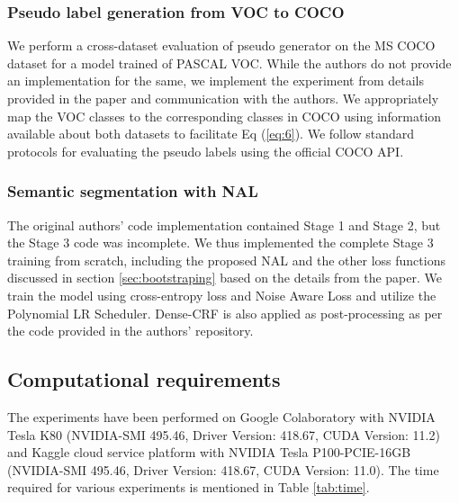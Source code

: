 \subsubsection{Pseudo label generation from VOC to COCO}

We perform a cross-dataset evaluation of pseudo generator on the MS COCO dataset for a model trained of PASCAL VOC. While the authors do not provide an implementation for the same, we implement the experiment from details provided in the paper and communication with the authors. We appropriately map the VOC classes to the corresponding classes in COCO using information available about both datasets to facilitate Eq (\ref{eq:6}). We follow standard protocols for evaluating the pseudo labels using the official COCO API.

\subsubsection{Semantic segmentation with NAL}

The original authors' code implementation contained Stage 1 and Stage 2, but the Stage 3 code was incomplete. We thus implemented the complete Stage 3 training from scratch, including the proposed NAL and the other loss functions discussed in section \ref{sec:bootstraping} based on the details from the paper. We train the model using cross-entropy loss and Noise Aware Loss and utilize the Polynomial LR Scheduler. Dense-CRF is also applied as post-processing as per the code provided in the authors' repository.


\subsection{Computational requirements}
The experiments have been performed on Google Colaboratory with NVIDIA Tesla K80 (NVIDIA-SMI 495.46, Driver Version: 418.67, CUDA Version: 11.2) and Kaggle cloud service platform with NVIDIA Tesla P100-PCIE-16GB (NVIDIA-SMI 495.46, Driver Version: 418.67, CUDA Version: 11.0). The time required for various experiments is mentioned in Table \ref{tab:time}.

